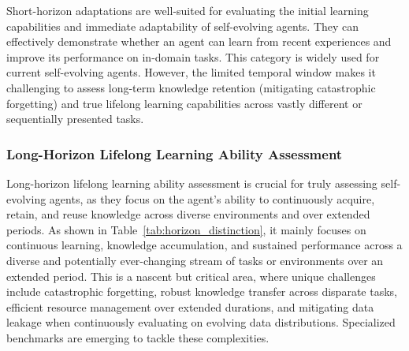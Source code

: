 \documentclass[10pt]{article} %
\begin{document}
Short-horizon adaptations are well-suited for evaluating the initial learning capabilities and immediate adaptability of self-evolving agents. They can effectively demonstrate whether an agent can learn from recent experiences and improve its performance on in-domain tasks. This category is widely used for current self-evolving agents. However, the limited temporal window makes it challenging to assess long-term knowledge retention (mitigating catastrophic forgetting) and true lifelong learning capabilities across vastly different or sequentially presented tasks.

\subsubsection{Long-Horizon Lifelong Learning Ability Assessment}
Long-horizon lifelong learning ability assessment is crucial for truly assessing self-evolving agents, as they focus on the agent's ability to continuously acquire, retain, and reuse knowledge across diverse environments and over extended periods. As shown in Table~\ref{tab:horizon_distinction}, it mainly focuses on continuous learning, knowledge accumulation, and sustained performance across a diverse and potentially ever-changing stream of tasks or environments over an extended period.
This is a nascent but critical area, where unique challenges include catastrophic forgetting, robust knowledge transfer across disparate tasks, efficient resource management over extended durations, and mitigating data leakage when continuously evaluating on evolving data distributions. Specialized benchmarks are emerging to tackle these complexities.
\end{document}
